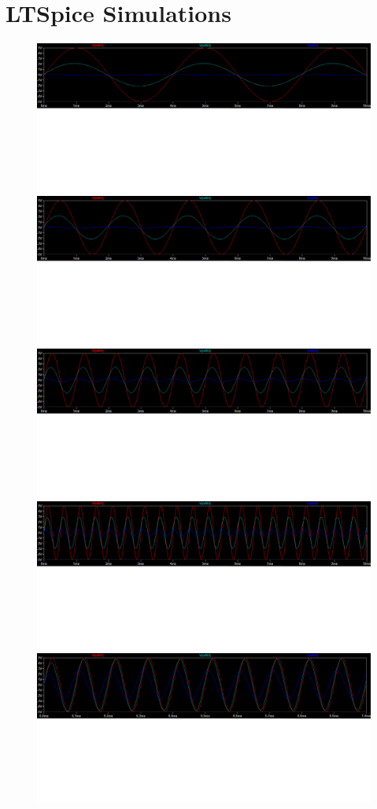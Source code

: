 \documentclass{article}
\begin{document}
\section*{LTSpice Simulations}
\begin {figure}
  \includegraphics[width=\linewidth]{250hz.png}
  \includegraphics[width=\linewidth]{500hz.png}
  \includegraphics[width=\linewidth]{1khz.png}
  \includegraphics[width=\linewidth]{2000hz.png}
  \includegraphics[width=\linewidth]{10000hz.png}
\end{figure}

\end{document}
